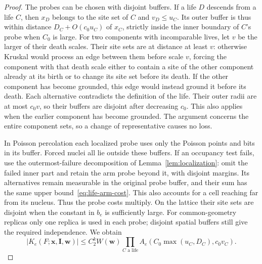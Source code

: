 \begin{proof}
The probes can be chosen with disjoint buffers.  If a life $D$ descends
from a life $C$, then $x_D$ belongs to the site set of $C$ and
$v_D\leq u_C$.  Its outer buffer is thus within distance
$D_C+O(c_0u_C)$ of $x_C$, strictly inside the inner boundary of $C$'s
probe when $C_0$ is large.  For two components with
incomparable lives, let $v$ be the larger of their death scales.  Their
site sets are at distance at least $v$: otherwise Kruskal would process
an edge between them before scale $v$, forcing the component with that
death scale either to contain a site of the other component already at
its birth or to change its site set before its death.  If the other
component has become grounded, this edge would instead ground it
before its death.  Each alternative contradicts the definition of the
life.  Their outer radii are at most $c_0v$, so their buffers are
disjoint after decreasing $c_0$.  This also applies when the earlier
component has become grounded.  The argument concerns the entire
component sets, so a change of representative causes no loss.

In Poisson percolation each localized probe uses only the Poisson
points and bits in its buffer.  Forced nuclei all lie outside these
buffers.  If an occupancy test fails, use the outermost-failure
decomposition of Lemma~\ref{lem:localization}: omit the failed inner
part and retain the arm probe beyond it, with disjoint margins.  Its
alternatives remain measurable in the original probe buffer, and
their sum has the same upper bound~\eqref{eq:life-arm-cost}.  This also
accounts for a cell reaching far from its nucleus.  Thus the probe
costs multiply.  On the lattice their site sets are disjoint when the
constant in $b_e$ is sufficiently large.  For common-geometry replicas
only one replica is used in each probe; disjoint spatial buffers still
give the required independence.  We obtain
\begin{equation}
 |K_e(F;\mathbf x,\mathbf I,\mathbf w)|
 \leq C_2^k W(\mathbf w)
       \prod_{C\text{ a life}}
          A_e(C_0\max(u_C,D_C),c_0v_C).
 \label{eq:probe-product}
\end{equation}


\end{proof}
